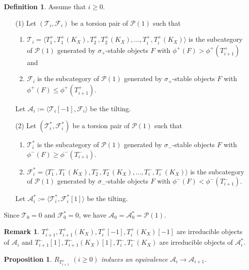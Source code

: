 \documentclass[leqno,11pt]{amsart}
\newtheorem{Prop}[Thm]{Proposition}
\theoremstyle{definition}
\newtheorem{Def}[Thm]{Definition}
\newtheorem{Rem}[Thm]{Remark}
\def\AA{\ensuremath{\mathcal A}}
\def\FF{\ensuremath{\mathcal F}}
\def\PP{\ensuremath{\mathcal P}}
\def\TT{\ensuremath{\mathcal T}}
\begin{document}
\begin{Def}
Assume that $i  \geq 0$.
\begin{enumerate}
\item[(1)]
Let $(\TT_i,\FF_i)$ be a torsion pair of $\PP(1)$ such that
\begin{enumerate}
\item
$\TT_i=\langle T_1^+,T_1^+(K_X),T_2^+,T_2^+ (K_X),...,
T_i^+,T_i^+ (K_X) \rangle$ 
is the subcategory of $\PP(1)$ generated by $\sigma_+$-stable objects
$F$ with $\phi^+(F)>\phi^+(T_{i+1}^+)$ and
\item
$\FF_i$ is the subcategory of $\PP(1)$ generated by 
$\sigma_+$-stable objects $F$
with $\phi^+(F) \leq \phi^+(T_{i+1}^+)$.
\end{enumerate}
Let $\AA_i:=\langle \TT_i[-1],\FF_i \rangle$ be the tilting.
\item[(2)]
Let $(\TT_i^*,\FF_i^*)$ be a torsion pair of $\PP(1)$ such that
\begin{enumerate}
\item
$\TT_i^*$ is the subcategory of $\PP(1)$ generated by 
$\sigma_-$-stable objects $F$
with $\phi^-(F) \geq \phi^-(T_{i+1}^-)$.
\item
$\FF_i^*=\langle T_1^-,T_1^-(K_X),T_2^-,T_2^-(K_X),...,
T_i^-,T_i^-(K_X) \rangle$ 
is the subcategory of $\PP(1)$ generated by $\sigma_-$-stable objects
$F$ with $\phi^-(F)<\phi^-(T_{i+1}^-)$.
\end{enumerate}
Let $\AA_i^*:=\langle \TT_i^*,\FF_i^*[1] \rangle$ be the tilting.
\end{enumerate}
\end{Def}
Since
$\TT_0=0$ and $\FF_0^*=0$,
we have $\AA_0=\AA_0^*=\PP(1)$.


\begin{Rem}\label{rem:simple-objects}
$T_{i+1}^+,T_{i+1}^+(K_X), T_i^+[-1],T_i^+(K_X)[-1]$ are irreducible objects of $\AA_i$
and 
$T_{i+1}^-[1],T_{i+1}^-(K_X)[1], T_i^-,T_i^-(K_X)$ are irreducible objects of $\AA_i^*$.
\end{Rem}









\begin{Prop}\label{Prop:equiv1}
$R_{T_{i+1}^+}$ $(i \geq 0)$ induces an equivalence
$\AA_i \to \AA_{i+1}$.
\end{Prop}
\end{document}
